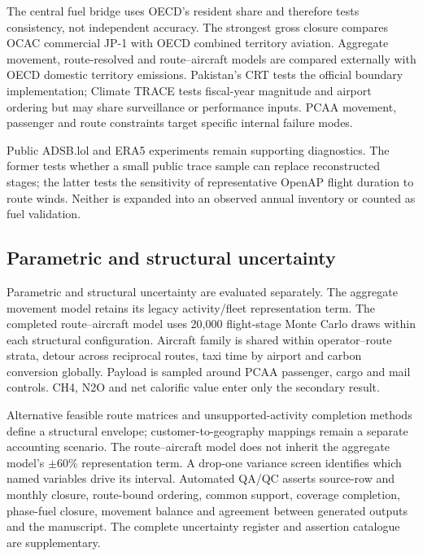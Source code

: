 The central fuel bridge uses OECD's resident share and therefore tests consistency, not
independent accuracy. The strongest gross closure compares OCAC commercial JP-1 with OECD
combined territory aviation. Aggregate movement, route-resolved and route--aircraft models are
compared externally with OECD domestic territory emissions. Pakistan's CRT tests the official
boundary implementation; Climate TRACE tests fiscal-year magnitude and airport ordering but
may share surveillance or performance inputs. PCAA movement, passenger and route constraints
target specific internal failure modes.

Public ADSB.lol and ERA5 experiments remain supporting diagnostics. The former tests whether a
small public trace sample can replace reconstructed stages; the latter tests the sensitivity of
representative OpenAP flight duration to route winds. Neither is expanded into an observed
annual inventory or counted as fuel validation.

\subsection{Parametric and structural uncertainty}

Parametric and structural uncertainty are evaluated separately. The aggregate movement model
retains its legacy activity/fleet representation term. The completed route--aircraft model uses
20,000 flight-stage Monte Carlo draws within each structural configuration. Aircraft family is
shared within operator--route strata, detour across reciprocal routes, taxi time by airport and
carbon conversion globally. Payload is sampled around PCAA passenger, cargo and mail controls.
CH4, N2O and net calorific value enter only the secondary \COe{} result.

Alternative feasible route matrices and unsupported-activity completion methods define a
structural envelope; customer-to-geography mappings remain a separate accounting scenario.
The route--aircraft model does not inherit the aggregate model's $\pm60$\% representation term.
A drop-one variance screen identifies which named variables drive its interval. Automated QA/QC
asserts source-row and monthly closure, route-bound ordering, common support, coverage
completion, phase-fuel closure, movement balance and agreement between generated outputs and
the manuscript. The complete uncertainty register and assertion catalogue are supplementary.
